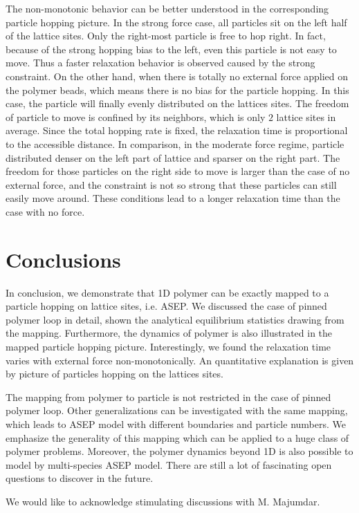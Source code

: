 \documentclass[aps,showpacs,twocolumn,floatfix,prx,superscriptaddress]{revtex4-1}
\begin{document}
The non-monotonic behavior can be better understood in the corresponding
particle hopping picture. In the strong force case, all particles sit on the
left half of the lattice sites. Only the right-most particle is free to hop
right. In fact, because of the strong hopping bias to the left, even this
particle is not easy to move. Thus a faster relaxation behavior is observed
caused by the strong constraint. On the other hand, when there is totally no
external force applied on the polymer beads, which means there is no bias for
the particle hopping. In this case, the particle will finally evenly
distributed on the lattices sites. The freedom of particle to move is confined
by its neighbors, which is only $2$ lattice sites in average. Since the total
hopping rate is fixed, the relaxation time is proportional to the accessible
distance. In comparison, in the moderate force regime, particle distributed
denser on the left part of lattice and sparser on the right part. The freedom
for those particles on the right side to move is larger than the case of no
external force, and the constraint is not so strong that these particles can
still easily move around. These conditions lead to a longer relaxation time than
the case with no force. 

\section{Conclusions}
In conclusion, we demonstrate that 1D polymer can be exactly mapped to a
particle hopping on lattice sites, i.e. ASEP.  We discussed the case of pinned
polymer loop in detail, shown the analytical equilibrium statistics drawing
from the mapping. Furthermore, the dynamics of polymer is also illustrated
in the mapped particle hopping picture. Interestingly, we found the relaxation
time varies with external force non-monotonically. An quantitative explanation
is given by picture of particles hopping on the lattices sites.  

The mapping from polymer to particle is not restricted in the case of pinned
polymer loop. Other generalizations can be investigated with the same mapping,
which leads to ASEP model with different boundaries and particle numbers. We
emphasize the generality of this mapping which can be applied to a huge class of
polymer problems. Moreover, the polymer dynamics beyond 1D is also possible to
model by multi-species ASEP model. There are still a lot of fascinating open
questions to discover in the future.

\begin{acknowledgments}
We would like to acknowledge stimulating discussions with M. Majumdar.\end{acknowledgments}


\end{document}
